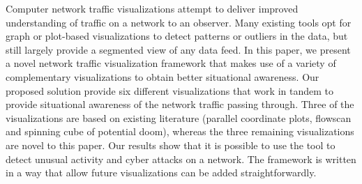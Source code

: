 Computer network traffic visualizations attempt to deliver improved understanding of traffic on a network to an observer. 
Many existing tools opt for graph or plot-based visualizations to detect patterns or outliers in the data, but still largely
provide a segmented view of any data feed. In this paper, we present a novel network traffic visualization framework that 
makes use of a variety of complementary visualizations to obtain better situational awareness. Our proposed solution provide 
six different visualizations that work in tandem to provide situational awareness of the network traffic passing through. Three of 
the visualizations are based on existing literature (parallel coordinate plots, flowscan and spinning cube of potential doom), whereas the 
three remaining visualizations are novel to this paper. Our results show that it is possible to use the tool to detect unusual activity 
and cyber attacks on a network. The framework is written in a way that allow future visualizations can be added straightforwardly. 
